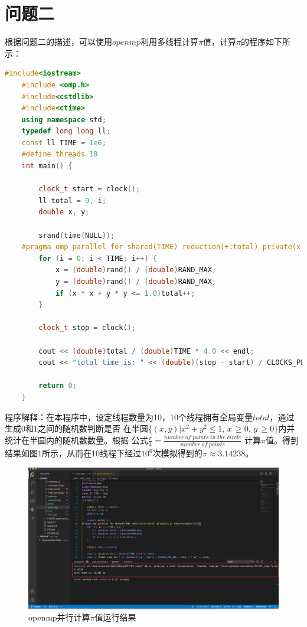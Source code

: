 \documentclass[12pt]{article}
\begin{document}
\section{问题二}
    根据问题二的描述，可以使用$openmp$利用多线程计算$\pi$值，计算$\pi$的程序如下所示：
\begin{lstlisting}[language=C++]
	#include<iostream>
	#include <omp.h>
	#include<cstdlib>
	#include<ctime>
	using namespace std;
	typedef long long ll;
	const ll TIME = 1e6;
	#define threads 10
	int main() {
	
		clock_t start = clock();
		ll total = 0, i;
		double x, y;
		
		srand(time(NULL));
	#pragma omp parallel for shared(TIME) reduction(+:total) private(x,y) num_threads(threads)
		for (i = 0; i < TIME; i++) {
			x = (double)rand() / (double)RAND_MAX;
			y = (double)rand() / (double)RAND_MAX;
			if (x * x + y * y <= 1.0)total++;
		}
	
		clock_t stop = clock();
	
		cout << (double)total / (double)TIME * 4.0 << endl;
		cout << "total time is: " << (double)(stop - start) / CLOCKS_PER_SEC * 1000 << " ms" << endl;
	
		return 0;
	}
\end{lstlisting}

    程序解释：在本程序中，设定线程数量为10，10个线程拥有全局变量$total$，通过生成0和1之间的随机数判断是否
    在半圆$\{(x,y)|x^{2}+y^{2} \le 1,\,x\,\ge 0,\,y\,\ge 0\}$内并统计在半圆内的随机数数量。根据
    公式$\frac{\pi}{4} = \frac{number\; of \; points\; in\; the\; circle}{number\; of\; points}$
    计算$\pi$值。得到结果如图1所示，从而在10线程下经过$10^{6}$次模拟得到的$\pi \approx 3.14238$。
    \begin{figure}[htbp]
		\centering
		\includegraphics[width=1.0\textwidth]{omp2.png}
		\caption{openmp并行计算$\pi$值运行结果}
	\end{figure}
\end{document}
